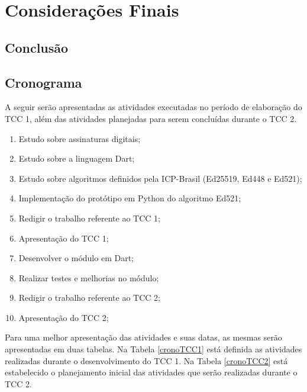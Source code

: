 \chapter[Considerações Finais]{Considerações Finais}

\section{Conclusão}

\section{Cronograma}

A seguir serão apresentadas as atividades executadas no período de elaboração do TCC 1, além das atividades planejadas para serem concluídas durante o TCC 2.

\begin{enumerate}
    \item Estudo sobre assinaturas digitais;
    \item Estudo sobre a linguagem Dart;
    \item Estudo sobre algoritmos definidos pela ICP-Brasil (Ed25519, Ed448 e Ed521);
    \item Implementação do protótipo em Python do algoritmo Ed521;
    \item Redigir o trabalho referente ao TCC 1;
    \item Apresentação do TCC 1;
    \item Desenvolver o módulo em Dart;
    \item Realizar testes e melhorias no módulo;
    \item Redigir o trabalho referente ao TCC 2;
    \item Apresentação do TCC 2;
\end{enumerate}

Para uma melhor apresentação das atividades e suas datas, as mesmas serão apresentadas em duas tabelas. Na Tabela \ref{cronoTCC1} está definida as atividades realizadas durante o desenvolvimento do TCC 1. Na Tabela \ref{cronoTCC2} está estabelecido o planejamento inicial das atividades que serão realizadas durante o TCC 2.

